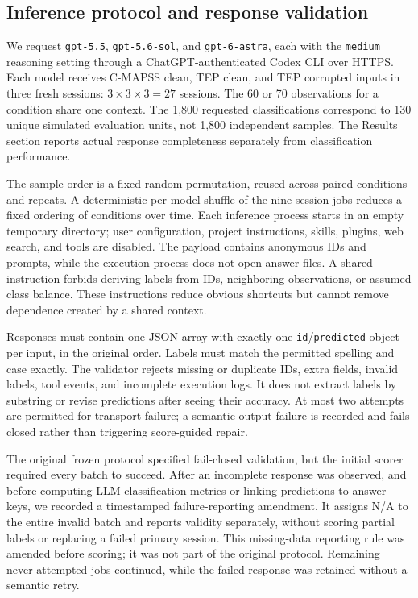 \documentclass[11pt,a4paper]{article}
\begin{document}
\subsection{Inference protocol and response validation}
We request \texttt{gpt-5.5}, \texttt{gpt-5.6-sol}, and \texttt{gpt-6-astra}, each with the \texttt{medium} reasoning setting through a ChatGPT-authenticated Codex CLI over HTTPS. Each model receives C-MAPSS clean, TEP clean, and TEP corrupted inputs in three fresh sessions: $3\times3\times3=27$ sessions. The 60 or 70 observations for a condition share one context. The 1,800 requested classifications correspond to 130 unique simulated evaluation units, not 1,800 independent samples. The Results section reports actual response completeness separately from classification performance.

The sample order is a fixed random permutation, reused across paired conditions and repeats. A deterministic per-model shuffle of the nine session jobs reduces a fixed ordering of conditions over time. Each inference process starts in an empty temporary directory; user configuration, project instructions, skills, plugins, web search, and tools are disabled. The payload contains anonymous IDs and prompts, while the execution process does not open answer files. A shared instruction forbids deriving labels from IDs, neighboring observations, or assumed class balance. These instructions reduce obvious shortcuts but cannot remove dependence created by a shared context.

Responses must contain one JSON array with exactly one \texttt{id}/\texttt{predicted} object per input, in the original order. Labels must match the permitted spelling and case exactly. The validator rejects missing or duplicate IDs, extra fields, invalid labels, tool events, and incomplete execution logs. It does not extract labels by substring or revise predictions after seeing their accuracy. At most two attempts are permitted for transport failure; a semantic output failure is recorded and fails closed rather than triggering score-guided repair.

The original frozen protocol specified fail-closed validation, but the initial scorer required every batch to succeed. After an incomplete response was observed, and before computing LLM classification metrics or linking predictions to answer keys, we recorded a timestamped failure-reporting amendment. It assigns N/A to the entire invalid batch and reports validity separately, without scoring partial labels or replacing a failed primary session. This missing-data reporting rule was amended before scoring; it was not part of the original protocol. Remaining never-attempted jobs continued, while the failed response was retained without a semantic retry.
\end{document}
